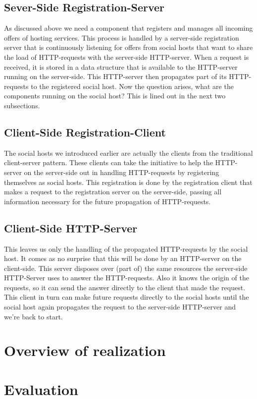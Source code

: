 \documentclass[a4paper, 10pt]{article}
\begin{document}
\subsection{Sever-Side Registration-Server}
As discussed above we need a component that registers and manages all incoming offers of hosting services. This process is handled by a server-side registration server that is continuously listening for offers from social hosts that want to share the load of HTTP-requests with the server-side HTTP-server. When a request is received, it is stored in a data structure that is available to the HTTP-server running on the server-side. This HTTP-server then propagates part of its HTTP-requests to the registered social host. Now the question arises, what are the components running on the social host? This is lined out in the next two subsections.

\subsection{Client-Side Registration-Client}
The social hosts we introduced earlier are actually the clients from the traditional client-server pattern. These clients can take the initiative to help the HTTP-server on the server-side out in handling HTTP-requests by registering themselves as social hosts. This registration is done by the registration client that makes a request to the registration server on the server-side, passing all information necessary for the future propagation of HTTP-requests. 

\subsection{Client-Side HTTP-Server}
This leaves us only the handling of the propagated HTTP-requests by the social host. It comes as no surprise that this will be done by an HTTP-server on the client-side. This server disposes over (part of) the same resources the server-side HTTP-Server uses to answer the HTTP-requests. Also it knows the origin of the requests, so it can send the answer directly to the client that made the request. This client in turn can make future requests directly to the social hosts until the social host again propagates the request to the server-side HTTP-server and we're back to start.

\section{Overview of realization}

\section{Evaluation}




\begin{lstlisting}
\end{lstlisting}
\end{document}
